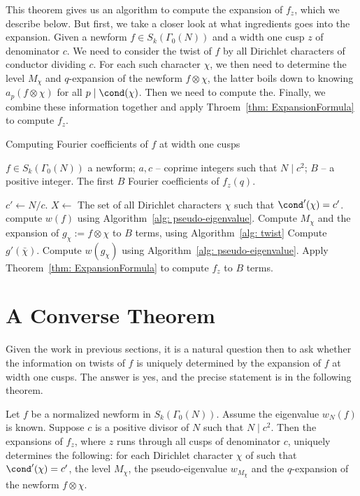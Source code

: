 \documentclass [11pt, proquest] {uwthesis}[2015/03/03]
\begin{document}
This theorem gives us an algorithm to compute the expansion of $f_z$, which we describe below. But first, we take a closer look at what ingredients goes into the expansion. Given a newform $f \in S_k(\Gamma_0(N))$ and a width one cusp $z$ of denominator $c$. We need to consider the twist of $f$ by all Dirichlet characters of conductor dividing $c$. 
For each such character $\chi$, we then need to determine the level $M_\chi$ and $q$-expansion of the newform $f \otimes \chi$, the latter boils down to knowing $a_p(f \otimes \chi)$ for all $p \mid \cond(\chi)$. Then we need to compute the. Finally, we combine these information together and apply Throem~\ref{thm: ExpansionFormula} to compute $f_z$. 

\begin{algorithm}[H]
\caption{Computing Fourier coefficients of $f$ at width one cusps}
\label{alg: qexp}
\begin{algorithmic}[1]
    \Require $f \in S_k(\Gamma_0(N))$ a newform; $a, c$ -- coprime integers such that $N \mid c^2$; $B$ -- a positive integer. 
    \Ensure The first $B$ Fourier coefficients of $f_{z}(q)$. 
    
    \State  $c' \gets N/c$. $X \gets$ The set of all Dirichlet characters $\chi$ such that $\cond'(\chi) = c'$. 
    \State compute $w(f)$  using Algorithm~\ref{alg: pseudo-eigenvalue}. 
    	\State Compute $M_\chi$ and the expansion of $g_\chi := f \otimes \chi$ to $B$ terms, using  Algorithm~\ref{alg: twist}
    	\State Compute $g'(\bar{\chi})$. 
	\State Compute $w(g_\chi)$ using Algorithm~\ref{alg: pseudo-eigenvalue}.
    \EndFor
    \State Apply Theorem~\ref{thm: ExpansionFormula} to compute $f_z$ to $B$ terms. 
    \end{algorithmic}
\end{algorithm}

\section{A Converse Theorem}

Given the work in previous sections, it is a natural question then to ask whether the information on twists of $f$ is uniquely determined by the expansion of $f$ at width one cusps. The answer is yes, and the precise statement is in the following theorem. 

\begin{theorem}
Let $f$ be a normalized newform in $S_k(\Gamma_0(N))$. Assume the eigenvalue $w_N(f)$ is known. Suppose $c$ is a positive divisor of $N$ such that $N \mid c^2$.  Then the expansions of $f_z$, where $z$ runs through all cusps of denominator $c$, uniquely determines the following: for each Dirichlet character 
$\chi$ of such that $\cond'(\chi) = c'$, the level $M_\chi$, the pseudo-eigenvalue $w_{M_\chi}$ and the $q$-expansion of the newform $f \otimes \chi$. 
\end{theorem}
\end{document}
